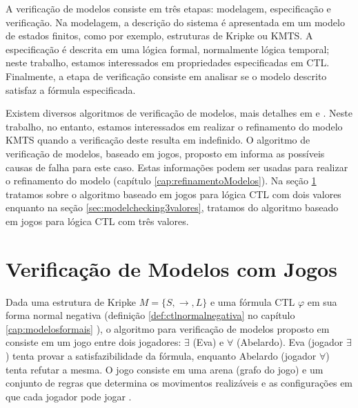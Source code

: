 \documentclass[normaltoc,capchap,capsec,times]{abnt}
\begin{document}
A verificação de modelos consiste em três etapas: modelagem, especificação e verificação. Na modelagem, a descrição do sistema é apresentada em um modelo de estados finitos, como por exemplo, estruturas de Kripke ou KMTS. A especificação é descrita em uma lógica formal, normalmente lógica temporal; neste trabalho, estamos interessados em propriedades especificadas em CTL. Finalmente, a etapa de verificação consiste em analisar se o modelo descrito satisfaz a fórmula especificada.



Existem diversos algoritmos de verificação de modelos, mais detalhes em \cite{huth} e \cite{clarke}. Neste trabalho, no entanto, estamos interessados em realizar o refinamento do modelo KMTS quando a verificação deste resulta em indefinido. O algoritmo de verificação de modelos,  baseado em jogos, proposto em \cite{grumbergalg} informa as possíveis causas de falha para este caso. Estas informações podem ser usadas para realizar o refinamento do modelo (capítulo \ref{cap:refinamentoModelos}). 
 Na seção \ref{sec:modelcheckingjogos} tratamos sobre o algoritmo baseado em jogos para lógica CTL com dois valores enquanto na seção \ref{sec:modelchecking3valores}, tratamos do algoritmo baseado em jogos para lógica CTL com três valores.

\section{Verificação de Modelos com Jogos}
\label{sec:modelcheckingjogos}

Dada uma estrutura de Kripke $M = \{ S,\to, L \}$ e uma fórmula CTL $\varphi$ em sua forma normal negativa (definição \ref{def:ctlnormalnegativa} no capítulo \ref{cap:modelosformais} ), o algoritmo para verificação de modelos proposto em \cite{grumbergalg} consiste em um jogo entre dois jogadores: $\exists$ (Eva) e $\forall$ (Abelardo). Eva (jogador $\exists$) tenta provar a satisfazibilidade da fórmula, enquanto Abelardo (jogador $\forall$) tenta refutar a mesma. O jogo consiste em uma arena (grafo do jogo) e um conjunto de regras que determina os movimentos realizáveis e as configurações em que cada jogador pode jogar .
\end{document}
